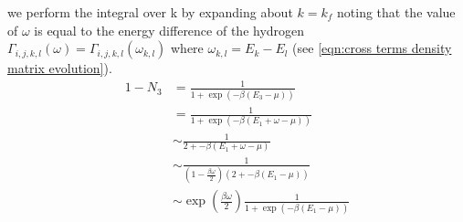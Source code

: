 we perform the integral over k by expanding about
\(k = k_f\) noting that the value of
\(\omega \) is equal to the energy
difference of the hydrogen
\(\Gamma_{i,j, k,l}(\omega) = \Gamma_{i,j, k,l}(\omega_{k,l})\)
where \(\omega_{k,l} = E_k - E_l\)
(see \cref{eqn:cross terms density matrix evolution}).
\begin{align}
    1 - N_3 & = \frac{1}{1 + \exp{(-\beta(E_3 - \mu))}}                                  \\
            & = \frac{1}{1 + \exp{(-\beta(E_1 + \omega - \mu))}}                         \\
            & \sim \frac{1}{2 + -\beta(E_1 + \omega - \mu)}                              \\
            & \sim \frac{1}{(1 - \frac{\beta \omega}{2})(2 + -\beta(E_1  - \mu))}        \\
            & \sim \exp{(\frac{\beta \omega}{2})}\frac{1}{1 + \exp{(-\beta(E_1 - \mu))}}
\end{align}

